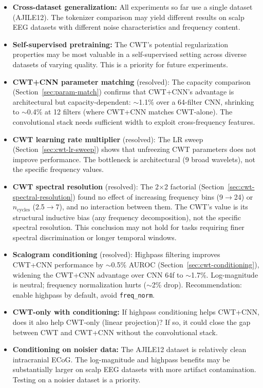 \documentclass[11pt, a4paper]{article}
\begin{document}
\begin{itemize}[nosep]
      \item \textbf{Cross-dataset generalization:} All experiments so far
            use a single dataset (AJILE12). The tokenizer comparison may
            yield different results on scalp EEG datasets with different
            noise characteristics and frequency content.
      \item \textbf{Self-supervised pretraining:} The CWT's potential
            regularization properties may be most valuable in a
            self-supervised setting across diverse datasets of varying
            quality. This is a priority for future experiments.
      \item \textbf{CWT+CNN parameter matching} (resolved): The
            capacity comparison (Section~\ref{sec:param-match})
            confirms that CWT+CNN's advantage is architectural but
            capacity-dependent: $\sim$1.1\% over a 64-filter CNN,
            shrinking to $\sim$0.4\% at 12 filters (where CWT+CNN
            matches CWT-alone). The convolutional stack needs
            sufficient width to exploit cross-frequency features.
      \item \textbf{CWT learning rate multiplier} (resolved): The LR
            sweep (Section~\ref{sec:cwt-lr-sweep}) shows that
            unfreezing CWT parameters does not improve performance.
            The bottleneck is architectural (9 broad wavelets), not
            the specific frequency values.
      \item \textbf{CWT spectral resolution} (resolved): The
            2$\times$2 factorial (Section~\ref{sec:cwt-spectral-resolution})
            found no effect of increasing frequency bins (9$\to$24) or
            $n_\text{cycles}$ (2.5$\to$7), and no interaction between them.
            The CWT's value is its structural inductive bias (any frequency
            decomposition), not the specific spectral resolution.  This
            conclusion may not hold for tasks requiring finer spectral
            discrimination or longer temporal windows.
      \item \textbf{Scalogram conditioning} (resolved): Highpass
            filtering improves CWT+CNN performance by $\sim$0.5\%
            AUROC (Section~\ref{sec:cwt-conditioning}), widening
            the CWT+CNN advantage over CNN 64f to $\sim$1.7\%.
            Log-magnitude is neutral; frequency normalization hurts
            ($\sim$2\% drop).  Recommendation: enable highpass by
            default, avoid \texttt{freq\_norm}.
      \item \textbf{CWT-only with conditioning:} If highpass
            conditioning helps CWT+CNN, does it also help CWT-only
            (linear projection)?  If so, it could close the gap
            between CWT and CWT+CNN without the convolutional stack.
      \item \textbf{Conditioning on noisier data:} The AJILE12
            dataset is relatively clean intracranial ECoG.  The
            log-magnitude and highpass benefits may be substantially
            larger on scalp EEG datasets with more artifact
            contamination.  Testing on a noisier dataset is a
            priority.
\end{itemize}
\end{document}
